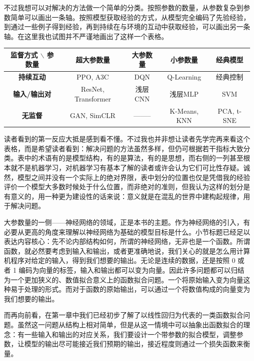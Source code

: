 不过我想可以对解决的方法做一个简单的分类。按照参数的数量，从参数复杂到参数简单可以画出一条轴。按照模型获取经验的方式，从模型完全编码了先验经验，到通过一些例子得到经验，再到持续在与环境的互动中获取经验，可以画出另一条轴。在这里我也试图并不严谨地画出了这样一个表格。
\begin{table}[H]
\centering
\begin{tabular}{c|cccc}
\toprule
\textbf{监督方式 $\backslash$ 参数量} & \textbf{超大参数量} & \textbf{大参数量} & \textbf{小参数量} & \textbf{经典模型} \\
\midrule
\textbf{持续互动} & PPO, A3C & DQN & Q-Learning & 经典控制\\
\textbf{输入/输出对} & ResNet, Transformer & 浅层CNN & 浅层MLP & SVM \\
\textbf{无监督} & GAN, SimCLR & -------- & K-Means, KNN & PCA, t-SNE \\
\bottomrule
\end{tabular}
\end{table}
读者看到的第一反应大抵是感到看不懂。不过我也并非想让读者先学完再来看这个表格，而是希望读者看到：解决问题的方法虽然多样，但仍可根据若干指标大致分类。表中的术语有的是模型结构，有的是算法，有的是思想，而右侧的一列甚至根本就不是机器学习，对机器学习有基本了解的读者或许会认为它们可比性存疑。诚然，模型之间并没有一个实际上的绝对界限，表中划分的位置也仅是凭借我的经验评价一个模型大多数时候处于什么位置，而非绝对的准则，但我认为这样的划分是有意义的，用一种更为建设性的话来说：意义就是在混乱的世界中建构起规律，用于解决问题。

大参数量的一侧——神经网络的领域，正是本书的主题。作为神经网络的引入，有必要从更高的角度来理解以神经网络为基础的模型目标是什么。小节标题已经足以表达内容核心：先不论内部结构如何，所谓的神经网络，无非也是一个函数。所谓函数，就必然要考虑到输入和输出，或者更准确地说，我们关心的就是怎么用计算机程序对给定的输入，得到我们想要的输出。无论是连续的数据，还是按照 0 或者 1 编码为向量的标签，输入和输出都可以变为向量。因此许多问题都可以归结为一个更加狭义的、数值拟合意义上的函数拟合问题。一个将原始输入变为向量这种易于处理的形式。而对于函数的原始输出，可以通过一个将数值构成的向量变为我们想要的输出。

而再向前看，在第一章中我们已经初步了解了以线性回归为代表的一类函数拟合问题。虽然这一问题从结构上相对简单，但是从这一情境中可以抽象出函数拟合的理念：有一些输入和输出的对应关系，我们要设计一个带参数的拟合模型，调整参数，让模型的输出尽可能接近我们预期的输出，接近程度则通过一个损失函数来衡量。


